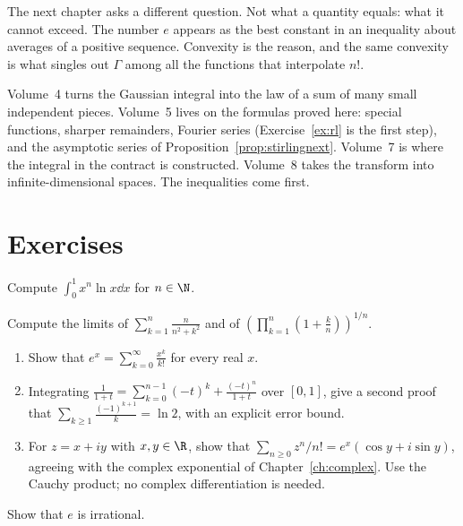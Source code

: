 The next chapter asks a different question. Not what a quantity equals: what it cannot exceed. The number $e$ appears as the best constant in an inequality about averages of a positive sequence. Convexity is the reason, and the same convexity is what singles out $\Gamma$ among all the functions that interpolate $n!$.

Volume~4 turns the Gaussian integral into the law of a sum of many small independent pieces. Volume~5 lives on the formulas proved here: special functions, sharper remainders, Fourier series (Exercise~\ref{ex:rl} is the first step), and the asymptotic series of Proposition~\ref{prop:stirlingnext}. Volume~7 is where the integral in the contract is constructed. Volume~8 takes the transform into infinite-dimensional spaces. The inequalities come first.

\section{Exercises}

\begin{exercise}[$\star$]\label{ex:xnlnx}
Compute $\displaystyle\int_0^1x^n\ln x\dd x$ for $n\in\N$.
\end{exercise}

\begin{exercise}[$\star$]\label{ex:riemann}
Compute the limits of $\displaystyle\sum_{k=1}^n\frac n{n^2+k^2}$ and of $\displaystyle\left(\prod_{k=1}^n\left(1+\frac kn\right)\right)^{1/n}$.
\end{exercise}

\begin{exercise}[$\star\star$]\label{ex:taylorln}
\begin{enumerate}[label=(\alph*)]
\item Show that $e^x=\sum_{k=0}^\infty\frac{x^k}{k!}$ for every real $x$.
\item Integrating $\frac1{1+t}=\sum_{k=0}^{n-1}(-t)^k+\frac{(-t)^n}{1+t}$ over $[0,1]$, give a second proof that $\sum_{k\ge1}\frac{(-1)^{k+1}}k=\ln2$, with an explicit error bound.
\item For $z=x+iy$ with $x,y\in\R$, show that
$\sum_{n\ge0}z^n/n!=e^x(\cos y+i\sin y)$, agreeing with the complex exponential
of Chapter~\ref{ch:complex}. Use the Cauchy product; no complex differentiation is needed.
\end{enumerate}
\end{exercise}

\begin{exercise}[$\star\star$]\label{ex:eirr}
Show that $e$ is irrational.
\end{exercise}

